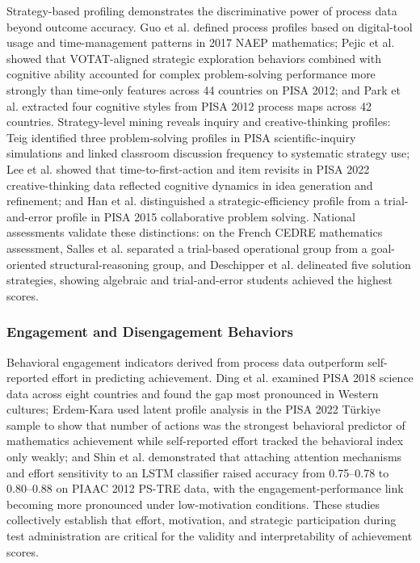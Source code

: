 \documentclass{ieeeaccess}
\begin{document}
Strategy-based profiling demonstrates the discriminative power of process data beyond outcome accuracy. Guo et al. \cite{guo-etal-ercikan2024} defined process profiles based on digital-tool usage and time-management patterns in 2017 NAEP mathematics; Pejic et al. \cite{pejic-etal2021} showed that VOTAT-aligned strategic exploration behaviors combined with cognitive ability accounted for complex problem-solving performance more strongly than time-only features across 44 countries on PISA 2012; and Park et al. \cite{park-etal2023} extracted four cognitive styles from PISA 2012 process maps across 42 countries. Strategy-level mining reveals inquiry and creative-thinking profiles: Teig \cite{teig2023} identified three problem-solving profiles in PISA scientific-inquiry simulations and linked classroom discussion frequency to systematic strategy use; Lee et al. \cite{lee-etalUncoveringBehavioralPatterns2025} showed that time-to-first-action and item revisits in PISA 2022 creative-thinking data reflected cognitive dynamics in idea generation and refinement; and Han et al. \cite{han-etal2023} distinguished a strategic-efficiency profile from a trial-and-error profile in PISA 2015 collaborative problem solving. National assessments validate these distinctions: on the French CEDRE mathematics assessment, Salles et al. \cite{salles-etal2020} separated a trial-based operational group from a goal-oriented structural-reasoning group, and Deschipper et al. \cite{deschipper-etal2025} delineated five solution strategies, showing algebraic and trial-and-error students achieved the highest scores.

\subsubsection{Engagement and Disengagement Behaviors}\label{subsubsec4.2.3}

Behavioral engagement indicators derived from process data outperform self-reported effort in predicting achievement. Ding et al. \cite{ding-etal2025} examined PISA 2018 science data across eight countries and found the gap most pronounced in Western cultures; Erdem-Kara \cite{erdem-kara-basak2025} used latent profile analysis in the PISA 2022 T\"{u}rkiye sample to show that number of actions was the strongest behavioral predictor of mathematics achievement while self-reported effort tracked the behavioral index only weakly; and Shin et al. \cite{shin-etal2024} demonstrated that attaching attention mechanisms and effort sensitivity to an LSTM classifier raised accuracy from 0.75--0.78 to 0.80--0.88 on PIAAC 2012 PS-TRE data, with the engagement-performance link becoming more pronounced under low-motivation conditions. These studies collectively establish that effort, motivation, and strategic participation during test administration are critical for the validity and interpretability of achievement scores.
\end{document}
